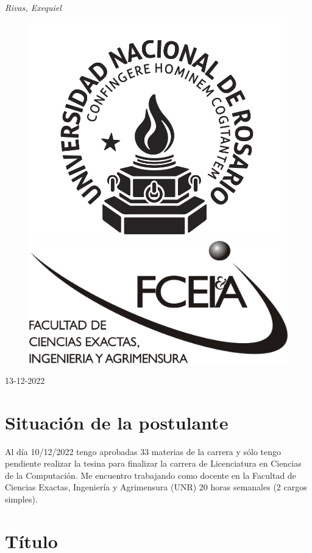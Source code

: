 \documentclass[11pt,a4paper]{article}
\begin{document}
\begin{titlepage}
    {\itshape\LARGE Rivas, Exequiel}
	
	\vspace{0.5\baselineskip} %
 
	\vspace*{6\baselineskip} %
    
    \begin{figure}[h] %
	\centering
	\includegraphics[width=0.4\linewidth]{Logo-Unr-1.png} \hfill \includegraphics[width=0.4\linewidth]{FCEIA.jpeg}
	\end{figure}
    
    \vfill %
	
		
	\vspace{0.3\baselineskip} %
	
	13-12-2022 %
	

\end{titlepage}



\section{Situación de la postulante}

Al día 10/12/2022 tengo aprobadas 33 materias de la carrera y sólo
tengo pendiente realizar la tesina para finalizar la carrera de
Licenciatura en Ciencias de la Computación. Me encuentro trabajando
como docente en la Facultad de Ciencias Exactas, Ingeniería y
Agrimensura (UNR) 20 horas semanales (2 cargos simples).

\section{Título}
\end{document}
